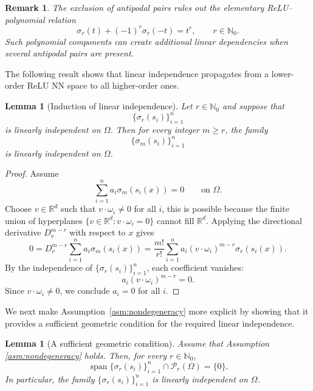\documentclass[pdflatex,sn-mathphys-num]{sn-jnl}
\newtheorem{lemma}[theorem]{Lemma}
\newtheorem{remark}[theorem]{Remark}
\numberwithin{equation}{section}
\numberwithin{theorem}{section}
\numberwithin{table}{section}
\numberwithin{figure}{section}
\begin{document}
\begin{remark}
The exclusion of antipodal pairs rules out the elementary ReLU–polynomial relation
\begin{equation}
\sigma_r(t)+(-1)^r\sigma_r(-t)=t^r,
\qquad r\in\mathbb N_0.
\end{equation}
Such polynomial components can create additional linear dependencies when several antipodal pairs are present.
\end{remark}

The following result shows that linear independence propagates from a lower-order ReLU NN space to all higher-order ones.
\begin{lemma}[Induction of linear independence]\label{lem:induction}
    Let $r\in\mathbb N_0$ and suppose that
    \begin{equation}
    \{\sigma_r(s_i)\}_{i=1}^n
    \end{equation}
    is linearly independent on $\Omega$. Then for every integer $m\ge r$, the family
    \begin{equation}
    \{\sigma_m(s_i)\}_{i=1}^n
    \end{equation}
    is linearly independent on $\Omega$.
\end{lemma}

\begin{proof}
    Assume
    \begin{equation}
    \sum_{i=1}^n a_i\sigma_m(s_i(x))=0
    \qquad\text{on }\Omega.
    \end{equation}
    Choose $v\in\mathbb  R  ^d$ such that $v\cdot\omega_i\neq0$ for all $i$, this is possible because the finite union of hyperplanes
    $\{v\in\mathbb  R  ^d:v\cdot\omega_i=0\}$ cannot fill $\mathbb  R  ^d$. Applying the directional derivative $D_v^{m-r}$ with respect to $x$ gives
    \begin{equation}
    0=D_v^{m-r}\sum_{i=1}^n a_i\sigma_m(s_i(x))
    =\frac{m!}{r!}\sum_{i=1}^n a_i(v\cdot\omega_i)^{m-r}\sigma_r(s_i(x)).
    \end{equation}
    By the independence of $\{\sigma_r(s_i)\}_{i=1}^n$, each coefficient vanishes:
    \begin{equation}
    a_i(v\cdot\omega_i)^{m-r}=0.
    \end{equation}
    Since $v\cdot\omega_i\neq0$, we conclude $a_i=0$ for all $i$.
\end{proof}

We next make Assumption~\ref{asm:nondegeneracy} more explicit by showing that it provides a sufficient geometric condition for the required linear independence.
\begin{lemma}[A sufficient geometric condition]\label{lem:sufficient}
    Assume that Assumption \ref{asm:nondegeneracy} holds. Then, for every $r\in\mathbb N_0$,
    \begin{equation}
    \operatorname{span}\{\sigma_r(s_i)\}_{i=1}^n\cap \mathcal P _r(\Omega)=\{0\}.
    \end{equation}
    In particular, the family $\{\sigma_r(s_i)\}_{i=1}^n$ is linearly independent on $\Omega$.
\end{lemma}
\end{document}
